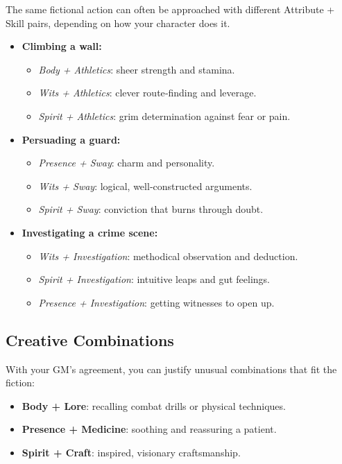 The same fictional action can often be approached with different Attribute + Skill
pairs, depending on how your character does it.

\begin{itemize}
  \item \textbf{Climbing a wall:}
    \begin{itemize}
      \item \textit{Body + Athletics}: sheer strength and stamina.
      \item \textit{Wits + Athletics}: clever route‑finding and leverage.
      \item \textit{Spirit + Athletics}: grim determination against fear or pain.
    \end{itemize}
  \item \textbf{Persuading a guard:}
    \begin{itemize}
      \item \textit{Presence + Sway}: charm and personality.
      \item \textit{Wits + Sway}: logical, well‑constructed arguments.
      \item \textit{Spirit + Sway}: conviction that burns through doubt.
    \end{itemize}
  \item \textbf{Investigating a crime scene:}
    \begin{itemize}
      \item \textit{Wits + Investigation}: methodical observation and deduction.
      \item \textit{Spirit + Investigation}: intuitive leaps and gut feelings.
      \item \textit{Presence + Investigation}: getting witnesses to open up.
    \end{itemize}
\end{itemize}

\subsection{Creative Combinations}
\label{sec:creative-dice-pools}
With your GM's agreement, you can justify unusual combinations that fit the
fiction:
\begin{itemize}
  \item \textbf{Body + Lore}: recalling combat drills or physical techniques.
  \item \textbf{Presence + Medicine}: soothing and reassuring a patient.
  \item \textbf{Spirit + Craft}: inspired, visionary craftsmanship.
\end{itemize}

